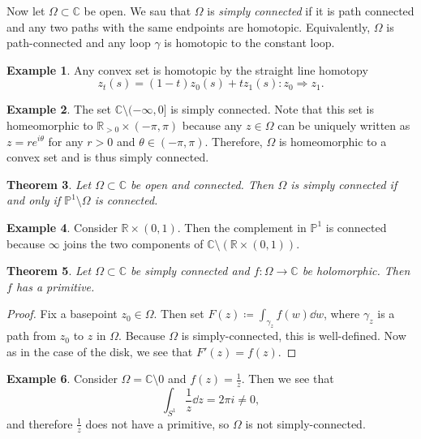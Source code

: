 \documentclass[leqno, openany]{memoir}
\newtheorem{thm}{Theorem}[section]
\theoremstyle{definition}
\newtheorem{exm}[thm]{Example}
\theoremstyle{remark}
\theoremstyle{plain}
\theoremstyle{definition}
\theoremstyle{remark}
\newcommand{\R}{\mathbb{R}}
\newcommand{\C}{\mathbb{C}}
\renewcommand{\P}{\mathbb{P}}
\begin{document}
Now let $\Omega \subset \C$ be open. We sau that $\Omega$ is \textit{simply
connected} if it is path connected and any two paths with the same endpoints
are homotopic. Equivalently, $\Omega$ is path-connected and any loop $\gamma$
is homotopic to the constant loop.

\begin{exm} Any convex set is homotopic by the straight line homotopy \[ z_t(s)
= (1-t) z_0(s) + t z_1(s) \colon z_0 \Rightarrow z_1. \] \end{exm}

\begin{exm} The set $\C \setminus (-\infty, 0]$ is simply connected. Note that
    this set is homeomorphic to $\R_{> 0} \times (-\pi, \pi)$ because any $z
    \in \Omega$ can be uniquely written as $z = re^{i\theta}$ for any $r > 0$
    and $\theta \in (-\pi, \pi)$. Therefore, $\Omega$ is homeomorphic to a
    convex set and is thus simply connected.  \end{exm}

\begin{thm} Let $\Omega \subset \C$ be open and connected. Then $\Omega$ is
simply connected if and only if $\P^1 \setminus \Omega$ is connected.
\end{thm}

\begin{exm} Consider $\R \times (0,1)$. Then the complement in $\P^1$ is
connected because $\infty$ joins the two components of $\C \setminus (\R \times
(0,1))$.  \end{exm}

\begin{thm} Let $\Omega \subset \C$ be simply connected and $f \colon \Omega
\to \C$ be holomorphic. Then $f$ has a primitive.  \end{thm}

\begin{proof} Fix a basepoint $z_0 \in \Omega$. Then set $F(z) \coloneqq
    \int_{\gamma_z} f(w) \dd{w}$, where $\gamma_z$ is a path from $z_0$ to $z$
    in $\Omega$. Because $\Omega$ is simply-connected, this is well-defined.
    Now as in the case of the disk, we see that $F'(z) = f(z)$.  \end{proof}

\begin{exm} Consider $\Omega = \C \setminus \qty{0}$ and $f(z) = \frac{1}{z}$.
    Then we see that \[ \int_{S^1} \frac{1}{z} \dd{z} = 2 \pi i \neq 0, \] and
    therefore $\frac{1}{z}$ does not have a primitive, so $\Omega$ is not
    simply-connected.  \end{exm}
\end{document}
